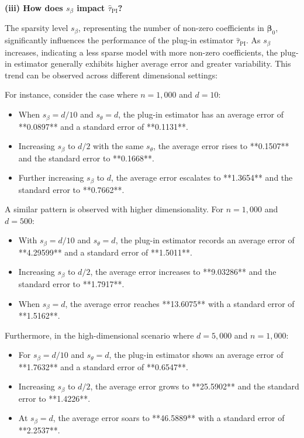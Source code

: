 \documentclass{article}
\begin{document}
\textbf{(iii) How does \( s_\beta \) impact \( \hat{\tau}_{\text{PI}} \)?}

The sparsity level \( s_\beta \), representing the number of non-zero coefficients in \( \boldsymbol{\beta}_0 \), significantly influences the performance of the plug-in estimator \( \hat{\tau}_{\text{PI}} \). As \( s_\beta \) increases, indicating a less sparse model with more non-zero coefficients, the plug-in estimator generally exhibits higher average error and greater variability. This trend can be observed across different dimensional settings:


For instance, consider the case where \( n = 1,000 \) and \( d = 10 \):
\begin{itemize}
  \item When \( s_\beta = d/10 \) and \( s_\theta = d \), the plug-in estimator has an average error of **0.0897** and a standard error of **0.1131**.
  \item Increasing \( s_\beta \) to \( d/2 \) with the same \( s_\theta \), the average error rises to **0.1507** and the standard error to **0.1668**.
  \item Further increasing \( s_\beta \) to \( d \), the average error escalates to **1.3654** and the standard error to **0.7662**.
\end{itemize}

A similar pattern is observed with higher dimensionality. For \( n = 1,000 \) and \( d = 500 \):
\begin{itemize}
  \item With \( s_\beta = d/10 \) and \( s_\theta = d \), the plug-in estimator records an average error of **4.29599** and a standard error of **1.5011**.
  \item Increasing \( s_\beta \) to \( d/2 \), the average error increases to **9.03286** and the standard error to **1.7917**.
  \item When \( s_\beta = d \), the average error reaches **13.6075** with a standard error of **1.5162**.
\end{itemize}

Furthermore, in the high-dimensional scenario where \( d = 5,000 \) and \( n = 1,000 \):
\begin{itemize}
  \item For \( s_\beta = d/10 \) and \( s_\theta = d \), the plug-in estimator shows an average error of **1.7632** and a standard error of **0.6547**.
  \item Increasing \( s_\beta \) to \( d/2 \), the average error grows to **25.5902** and the standard error to **1.4226**.
  \item At \( s_\beta = d \), the average error soars to **46.5889** with a standard error of **2.2537**.
\end{itemize}
\end{document}
